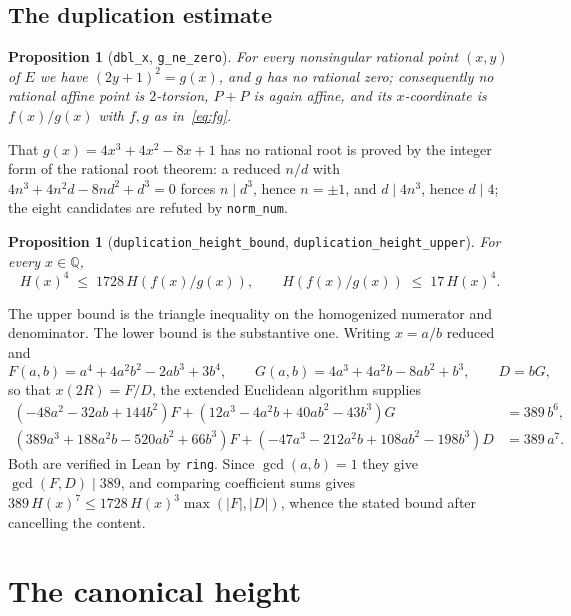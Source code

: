 \documentclass[11pt,reqno]{amsart}
\theoremstyle{plain}
\newtheorem{proposition}[theorem]{Proposition}
\theoremstyle{definition}
\theoremstyle{remark}
\DeclareRobustCommand{\lt}[1]{\texttt{#1}}
\newcommand{\nh}{H}
\begin{document}
\subsection{The duplication estimate}

\begin{proposition}[\lt{dbl\_x}, \lt{g\_ne\_zero}]\label{prop:dbl}
For every nonsingular rational point $(x,y)$ of $E$ we have
$(2y+1)^2 = g(x)$, and $g$ has no rational zero; consequently no rational
affine point is $2$-torsion, $P + P$ is again affine, and its
$x$-coordinate is $f(x)/g(x)$ with $f,g$ as in~\eqref{eq:fg}.
\end{proposition}

That $g(x) = 4x^3+4x^2-8x+1$ has no rational root is proved by the integer
form of the rational root theorem: a reduced $n/d$ with $4n^3 + 4n^2d -
8nd^2 + d^3 = 0$ forces $n \mid d^3$, hence $n = \pm 1$, and $d \mid 4n^3$,
hence $d \mid 4$; the eight candidates are refuted by \lt{norm\_num}.

\begin{proposition}[\lt{duplication\_height\_bound},
\lt{duplication\_height\_upper}]\label{prop:window}
For every $x \in \mathbb{Q}$,
\[
  \nh(x)^4 \;\le\; 1728\,\nh\!\left(f(x)/g(x)\right), \qquad
  \nh\!\left(f(x)/g(x)\right) \;\le\; 17\,\nh(x)^4 .
\]
\end{proposition}

The upper bound is the triangle inequality on the homogenized numerator and
denominator. The lower bound is the substantive one. Writing $x = a/b$
reduced and
\[
  F(a,b) = a^4 + 4a^2b^2 - 2ab^3 + 3b^4, \qquad
  G(a,b) = 4a^3 + 4a^2b - 8ab^2 + b^3, \qquad D = bG,
\]
so that $x(2R) = F/D$, the extended Euclidean algorithm supplies
\begin{align}
  (-48a^2 - 32ab + 144b^2)F + (12a^3 - 4a^2b + 40ab^2 - 43b^3)G
    &= 389\,b^6, \label{eq:bez1}\\
  (389a^3 + 188a^2b - 520ab^2 + 66b^3)F
    + (-47a^3 - 212a^2b + 108ab^2 - 198b^3)D &= 389\,a^7. \label{eq:bez2}
\end{align}
Both are verified in Lean by \lt{ring}. Since $\gcd(a,b) = 1$ they give
$\gcd(F,D) \mid 389$, and comparing coefficient sums gives
$389\,\nh(x)^7 \le 1728\,\nh(x)^3 \max(\lvert F\rvert, \lvert D\rvert)$,
whence the stated bound after cancelling the content.

\section{The canonical height}
\end{document}
